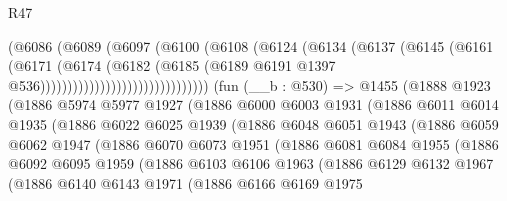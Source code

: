\begin{lexlean}{R47}
\begin{coremodule}
                                    (@6086
                                      (@6089
                                        (@6097
                                          (@6100
                                            (@6108
                                              (@6124
                                                (@6134
                                                  (@6137
                                                    (@6145
                                                      (@6161
                                                        (@6171
                                                          (@6174
                                                            (@6182
                                                              (@6185
                                                                (@6189
                                                                  @6191
                                                                  @1397
                                                                  @536)))))))))))))))))))))))))))))))
    (fun (__b : @530) =>
    @1455
      (@1888
        @1923
        (@1886
          @5974
          @5977
          @1927
          (@1886
            @6000
            @6003
            @1931
            (@1886
              @6011
              @6014
              @1935
              (@1886
                @6022
                @6025
                @1939
                (@1886
                  @6048
                  @6051
                  @1943
                  (@1886
                    @6059
                    @6062
                    @1947
                    (@1886
                      @6070
                      @6073
                      @1951
                      (@1886
                        @6081
                        @6084
                        @1955
                        (@1886
                          @6092
                          @6095
                          @1959
                          (@1886
                            @6103
                            @6106
                            @1963
                            (@1886
                              @6129
                              @6132
                              @1967
                              (@1886
                                @6140
                                @6143
                                @1971
                                (@1886
                                  @6166
                                  @6169
                                  @1975

\end{coremodule}
\end{lexlean}
